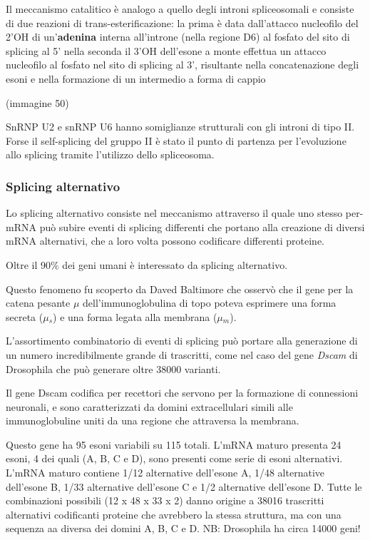 \documentclass[]{article}
\begin{document}
Il meccanismo catalitico è analogo a quello degli introni spliceosomali
e consiste di due reazioni di trans-esterificazione: la prima è data
dall'attacco nucleofilo del 2'OH di un'\textbf{adenina} interna
all'introne (nella regione D6) al fosfato del sito di splicing al 5'
nella seconda il 3'OH dell'esone a monte effettua un attacco nucleofilo
al fosfato nel sito di splicing al 3', risultante nella concatenazione
degli esoni e nella formazione di un intermedio a forma di cappio

(immagine 50)

SnRNP U2 e snRNP U6 hanno somiglianze strutturali con gli introni di
tipo II. Forse il self-splicing del gruppo II è stato il punto di
partenza per l'evoluzione allo splicing tramite l'utilizzo dello
spliceosoma.

\subsubsection{Splicing alternativo}\label{splicing-alternativo}

Lo splicing alternativo consiste nel meccanismo attraverso il quale uno
stesso per-mRNA può subire eventi di splicing differenti che portano
alla creazione di diversi mRNA alternativi, che a loro volta possono
codificare differenti proteine.

Oltre il 90\% dei geni umani è interessato da splicing alternativo.

Questo fenomeno fu scoperto da Daved Baltimore che osservò che il gene
per la catena pesante \(\mu\) dell'immunoglobulina di topo poteva
esprimere una forma secreta (\(\mu\)\(_s\)) e una forma legata alla
membrana (\(\mu\)\(_m\)).

L'assortimento combinatorio di eventi di splicing può portare alla
generazione di un numero incredibilmente grande di trascritti, come nel
caso del gene \emph{Dscam} di Drosophila che può generare oltre 38000
varianti.

Il gene Dscam codifica per recettori che servono per la formazione di
connessioni neuronali, e sono caratterizzati da domini extracellulari
simili alle immunoglobuline uniti da una regione che attraversa la
membrana.

Questo gene ha 95 esoni variabili su 115 totali. L'mRNA maturo presenta
24 esoni, 4 dei quali (A, B, C e D), sono presenti come serie di esoni
alternativi. L'mRNA maturo contiene 1/12 alternative dell'esone A, 1/48
alternative dell'esone B, 1/33 alternative dell'esone C e 1/2
alternative dell'esone D. Tutte le combinazioni possibili (12 x 48 x 33
x 2) danno origine a 38016 trascritti alternativi codificanti proteine
che avrebbero la stessa struttura, ma con una sequenza aa diversa dei
domini A, B, C e D. NB: Drosophila ha circa 14000 geni!
\end{document}
